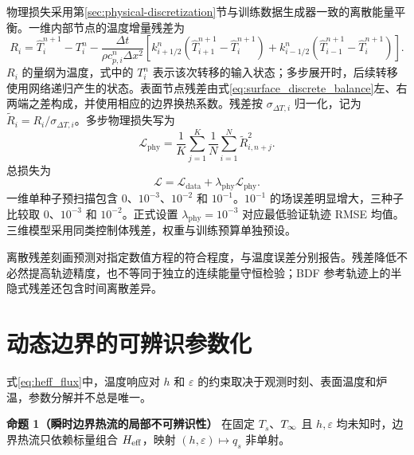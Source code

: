 物理损失采用第\ref{sec:physical-discretization}节与训练数据生成器一致的离散能量平衡。一维内部节点的温度增量残差为
\begin{equation}
  R_i=\widehat{T}_i^{n+1}-T_i^n
  -\frac{\Delta t}{\rho c_{p,i}^{n}\Delta x^2}\left[
  k_{i+1/2}^{n}(\widehat{T}_{i+1}^{n+1}-\widehat{T}_{i}^{n+1})
  +k_{i-1/2}^{n}(\widehat{T}_{i-1}^{n+1}-\widehat{T}_{i}^{n+1})
  \right].
  \label{eq:temperature_residual}
\end{equation}
$R_i$ 的量纲为温度，式中的 $T_i^n$ 表示该次转移的输入状态；多步展开时，后续转移使用网络递归产生的状态。表面节点残差由式\eqref{eq:surface_discrete_balance}左、右两端之差构成，并使用相应的边界换热系数。残差按 $\sigma_{\Delta T,i}$ 归一化，记为 $\widetilde{R}_i=R_i/\sigma_{\Delta T,i}$。多步物理损失写为
\begin{equation}
  \mathcal{L}_{\mathrm{phy}}
  =\frac{1}{K}\sum_{j=1}^{K}
  \frac{1}{N}\sum_{i=1}^{N}\widetilde{R}_{i,n+j}^{2}.
\end{equation}
总损失为
\begin{equation}
  \mathcal{L}=\mathcal{L}_{\mathrm{data}}+\lambda_{\mathrm{phy}}\mathcal{L}_{\mathrm{phy}}.
  \label{eq:total_loss}
\end{equation}
一维单种子预扫描包含 $0$、$10^{-3}$、$10^{-2}$ 和 $10^{-1}$。$10^{-1}$ 的场误差明显增大，三种子比较取 $0$、$10^{-3}$ 和 $10^{-2}$。正式设置 $\lambda_{\mathrm{phy}}=10^{-3}$ 对应最低验证轨迹 RMSE 均值。三维模型采用同类控制体残差，权重与训练预算单独预设。

离散残差刻画预测对指定数值方程的符合程度，与温度误差分别报告。残差降低不必然提高轨迹精度，也不等同于独立的连续能量守恒检验；BDF 参考轨迹上的半隐式残差还包含时间离散差异。

\section{动态边界的可辨识参数化}
\label{sec:boundary-identifiability}

式\eqref{eq:heff_flux}中，温度响应对 $h$ 和 $\varepsilon$ 的约束取决于观测时刻、表面温度和炉温，参数分解并不总是唯一。

\noindent\textbf{命题 1（瞬时边界热流的局部不可辨识性）}
在固定 $T_s$、${T_{\infty}}$ 且 $h,\varepsilon$ 均未知时，边界热流只依赖标量组合 ${H_{\mathrm{eff}}}$，映射 $(h,\varepsilon)\mapsto q_s$ 非单射。

